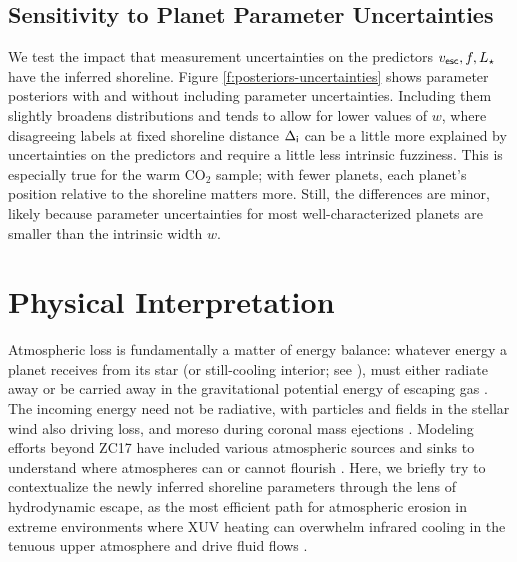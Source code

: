 \documentclass[modern,linenumbers,trackchanges]{aastex7}
\begin{document}
\subsection{Sensitivity to Planet Parameter Uncertainties}
We test the impact that measurement uncertainties on the predictors $v_{\sf esc}, f, L_\star$ have the inferred shoreline. Figure \ref{f:posteriors-uncertainties} shows parameter posteriors with and without including parameter uncertainties. Including them slightly broadens distributions and tends to allow for lower values of $w$, where disagreeing labels at fixed shoreline distance $\Delta_{\sf i}$ can be a little more explained by uncertainties on the predictors and require a little less intrinsic fuzziness. This is especially true for the warm CO$_2$ sample; with fewer planets, each planet's position relative to the shoreline matters more. Still, the differences are minor, likely because parameter uncertainties for most well-characterized planets are smaller than the intrinsic width $w$. 

\section{Physical Interpretation}
\label{s:physics}

Atmospheric loss is fundamentally a matter of energy balance: whatever energy a planet receives from its star (or still-cooling interior; see \citealt{guptaSculptingValleyRadius2019}), must either radiate away or be carried away in the gravitational potential energy of escaping gas \citep{lewisPlanetsTheirAtmospheres1984, chamberlainTheoryPlanetaryAtmospheres1987}. The incoming energy need not be radiative, with particles and fields in the stellar wind also driving loss, and moreso during coronal mass ejections \citep{lammerCoronalMassEjection2007, jakoskyMAVENObservationsResponse2015}. Modeling efforts beyond ZC17 have included various atmospheric sources and sinks to understand where atmospheres can or cannot flourish \citep{tianTHERMALESCAPESUPER2009,
lugerHabitableEvaporatedCores2015, 
owenEvaporationValleyKepler2017, 
wyattSusceptibilityPlanetaryAtmospheres2020, 
guptaCaughtActCorepowered2021,
chatterjeeNovelPhysicsEscaping2024, 
chinRolePlanetaryRadius2024a, 
giallucaImplicationsThermalHydrodynamic2024,
teixeiraCarbondeficientEvolutionTRAPPIST1c2024,
zengCosmicHydrogenIce2024,
vanlooverenAiryWorldsBarren2024,
vanlooverenHabitableZoneAtmosphere2025, 
leeCarvingEdgesRocky2025,
jiCosmicShorelineRevisited2025}. Here, we briefly try to contextualize the newly inferred shoreline parameters through the lens of hydrodynamic escape, as the most efficient path for atmospheric erosion in extreme environments where XUV heating can overwhelm infrared cooling in the tenuous upper atmosphere and drive fluid flows \citep{sekiyaDissipationRareGases1980, watsonDynamicsRapidlyEscaping1981}. 
\end{document}
